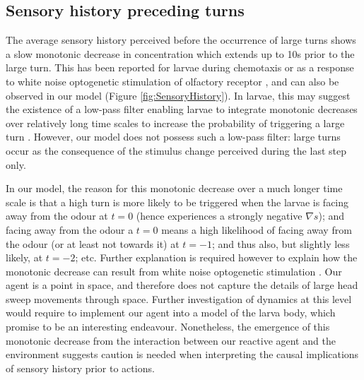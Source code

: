 \documentclass[11pt,a4paper]{article}
\newcommand{\todoML}[1]{\todo[author=ML,color=white, size=\tiny,inline]{#1}}
\begin{document}
\subsection{Sensory history preceding turns}
The average sensory history perceived before the occurrence of large turns shows a slow monotonic decrease in concentration which extends up to 10s prior to the large turn. This has been reported for larvae during chemotaxis \citep{gomez2011active} or as a response to white noise optogenetic stimulation of olfactory receptor \citep{gepner2015computations}, and can also be observed in our model (Figure \ref{fig:SensoryHistory}).
  In larvae, this may suggest the existence of a low-pass filter enabling larvae to integrate monotonic decreases over relatively long time scales to increase the probability of triggering a large turn \citep{gomez2011active,davies2015model,gepner2015computations}. However, our model does not possess such a low-pass filter: large turns occur as the consequence of the stimulus change perceived during the last step only.

 In our model, the reason for this monotonic decrease over a much longer time scale is that a high turn is more likely to be triggered when the larvae is facing away from the odour at $t=0$ (hence experiences a strongly negative $\nabla s$); and facing away from the odour a $t=0$ means a high likelihood of facing away from the odour (or at least not towards it) at $t=-1$; and thus also, but slightly less likely, at $t=-2$; etc.
  Further explanation is required however to explain how the monotonic decrease can result from white noise optogenetic stimulation \cite{gepner2015computations}. Our agent is a point in space, and therefore does not capture the details of large head sweep movements through space. Further investigation of dynamics at this level would require to implement our agent into a model of the larva body, which promise to be an interesting endeavour. Nonetheless, the emergence of this monotonic decrease from the interaction between our reactive agent and the environment suggests caution is needed when interpreting the causal implications of sensory history prior to actions.
\end{document}
